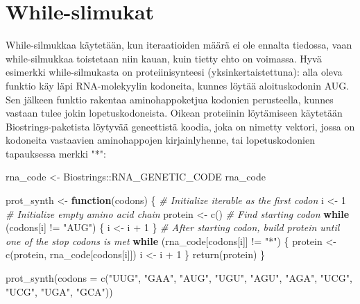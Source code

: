\documentclass[
]{book}
\newenvironment{Shaded}{\begin{snugshade}}{\end{snugshade}}
\newcommand{\AttributeTok}[1]{\textcolor[rgb]{0.77,0.63,0.00}{#1}}
\newcommand{\CommentTok}[1]{\textcolor[rgb]{0.56,0.35,0.01}{\textit{#1}}}
\newcommand{\ControlFlowTok}[1]{\textcolor[rgb]{0.13,0.29,0.53}{\textbf{#1}}}
\newcommand{\DecValTok}[1]{\textcolor[rgb]{0.00,0.00,0.81}{#1}}
\newcommand{\FunctionTok}[1]{\textcolor[rgb]{0.00,0.00,0.00}{#1}}
\newcommand{\NormalTok}[1]{#1}
\newcommand{\OtherTok}[1]{\textcolor[rgb]{0.56,0.35,0.01}{#1}}
\newcommand{\SpecialCharTok}[1]{\textcolor[rgb]{0.00,0.00,0.00}{#1}}
\newcommand{\StringTok}[1]{\textcolor[rgb]{0.31,0.60,0.02}{#1}}
\begin{document}
\hypertarget{while-slimukat}{%
\section{While-slimukat}\label{while-slimukat}}

While-silmukkaa käytetään, kun iteraatioiden määrä ei ole ennalta tiedossa, vaan while-silmukkaa toistetaan niin kauan, kuin tietty ehto on voimassa. Hyvä esimerkki while-silmukasta on proteiinisynteesi (yksinkertaistettuna): alla oleva funktio käy läpi RNA-molekyylin kodoneita, kunnes löytää aloituskodonin AUG. Sen jälkeen funktio rakentaa aminohappoketjua kodonien perusteella, kunnes vastaan tulee jokin lopetuskodoneista. Oikean proteiinin löytämiseen käytetään Biostrings-paketista löytyvää geneettistä koodia, joka on nimetty vektori, jossa on kodoneita vastaavien aminohappojen kirjainlyhenne, tai lopetuskodonien tapauksessa merkki "*":

\begin{Shaded}
\begin{Highlighting}[]
\NormalTok{rna\_code }\OtherTok{\textless{}{-}}\NormalTok{ Biostrings}\SpecialCharTok{::}\NormalTok{RNA\_GENETIC\_CODE}
\NormalTok{rna\_code}
\end{Highlighting}
\end{Shaded}

\begin{Shaded}
\begin{Highlighting}[]
\NormalTok{prot\_synth }\OtherTok{\textless{}{-}} \ControlFlowTok{function}\NormalTok{(codons) \{}
  \CommentTok{\# Initialize iterable as the first codon}
\NormalTok{  i }\OtherTok{\textless{}{-}} \DecValTok{1}
  \CommentTok{\# Initialize empty amino acid chain}
\NormalTok{  protein }\OtherTok{\textless{}{-}} \FunctionTok{c}\NormalTok{()}
  \CommentTok{\# Find starting codon}
  \ControlFlowTok{while}\NormalTok{ (codons[i] }\SpecialCharTok{!=} \StringTok{"AUG"}\NormalTok{) \{}
\NormalTok{    i }\OtherTok{\textless{}{-}}\NormalTok{ i }\SpecialCharTok{+} \DecValTok{1}
\NormalTok{  \}}
  \CommentTok{\# After starting codon, build protein until one of the stop codons is met}
  \ControlFlowTok{while}\NormalTok{ (rna\_code[codons[i]] }\SpecialCharTok{!=} \StringTok{"*"}\NormalTok{) \{}
\NormalTok{    protein }\OtherTok{\textless{}{-}} \FunctionTok{c}\NormalTok{(protein, rna\_code[codons[i]])}
\NormalTok{    i }\OtherTok{\textless{}{-}}\NormalTok{ i }\SpecialCharTok{+} \DecValTok{1}
\NormalTok{  \}}
  \FunctionTok{return}\NormalTok{(protein)}
\NormalTok{\}}

\FunctionTok{prot\_synth}\NormalTok{(}\AttributeTok{codons =} \FunctionTok{c}\NormalTok{(}\StringTok{"UUG"}\NormalTok{, }\StringTok{"GAA"}\NormalTok{, }\StringTok{"AUG"}\NormalTok{, }\StringTok{"UGU"}\NormalTok{, }\StringTok{"AGU"}\NormalTok{, }\StringTok{"AGA"}\NormalTok{, }\StringTok{"UCG"}\NormalTok{, }\StringTok{"UCG"}\NormalTok{, }\StringTok{"UGA"}\NormalTok{, }\StringTok{"GCA"}\NormalTok{))}
\end{Highlighting}
\end{Shaded}
\end{document}
